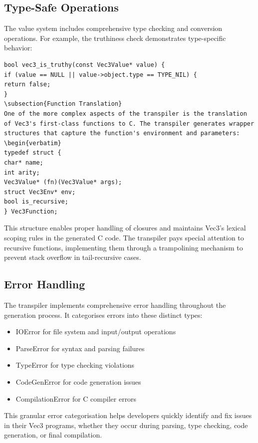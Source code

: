 \subsection{Type-Safe Operations}
The value system includes comprehensive type checking and conversion operations. For example, the truthiness check demonstrates type-specific behavior:
\begin{verbatim}
bool vec3_is_truthy(const Vec3Value* value) {
if (value == NULL || value->object.type == TYPE_NIL) {
return false;
}
\subsection{Function Translation}
One of the more complex aspects of the transpiler is the translation of Vec3's first-class functions to C. The transpiler generates wrapper structures that capture the function's environment and parameters:
\begin{verbatim}
typedef struct {
char* name;
int arity;
Vec3Value* (fn)(Vec3Value* args);
struct Vec3Env* env;
bool is_recursive;
} Vec3Function;
\end{verbatim}
This structure enables proper handling of closures and maintains Vec3's lexical scoping rules in the generated C code. 
The transpiler pays special attention to recursive functions, implementing them through a trampolining mechanism to prevent stack overflow in tail-recursive cases.
\subsection{Error Handling}
The transpiler implements comprehensive error handling throughout the generation process. 
It categorises errors into these distinct types:
\begin{itemize}
\item IOError for file system and input/output operations
\item ParseError for syntax and parsing failures
\item TypeError for type checking violations
\item CodeGenError for code generation issues
\item CompilationError for C compiler errors
\end{itemize}
This granular error categorisation helps developers quickly identify and fix issues in their Vec3 programs, whether they occur during parsing, type checking, code generation, or final compilation.
